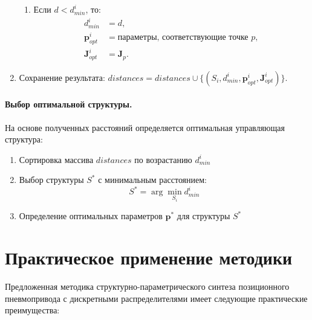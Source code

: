 \begin{enumerate}
\begin{enumerate}
              \item Если $d < d_{min}^i$, то:
                    \begin{equation*}
                        \begin{aligned}
                            d_{min}^i          & = d                                  ,         \\
                            \mathbf{p}_{opt}^i & = \text{параметры, соответствующие точке $p$}, \\
                            \mathbf{J}_{opt}^i & = \mathbf{J}_p.
                        \end{aligned}
                    \end{equation*}
          \end{enumerate}

    \item Сохранение результата: $distances = distances \cup \{(S_i, d_{min}^i, \mathbf{p}_{opt}^i, \mathbf{J}_{opt}^i)\}.$
\end{enumerate}

\paragraph*{Выбор оптимальной структуры.}

На основе полученных расстояний определяется оптимальная управляющая структура:

\begin{enumerate}
    \item Сортировка массива $distances$ по возрастанию $d_{min}^i$
    \item Выбор структуры $S^*$ с минимальным расстоянием:
          \begin{equation}
              S^* = \arg\min_{S_i} d_{min}^i
          \end{equation}
    \item Определение оптимальных параметров $\mathbf{p}^*$ для структуры $S^*$
\end{enumerate}

\section*{Практическое применение методики}

Предложенная методика структурно-параметрического синтеза позиционного
пневмопривода с дискретными распределителями имеет следующие практические преимущества:

